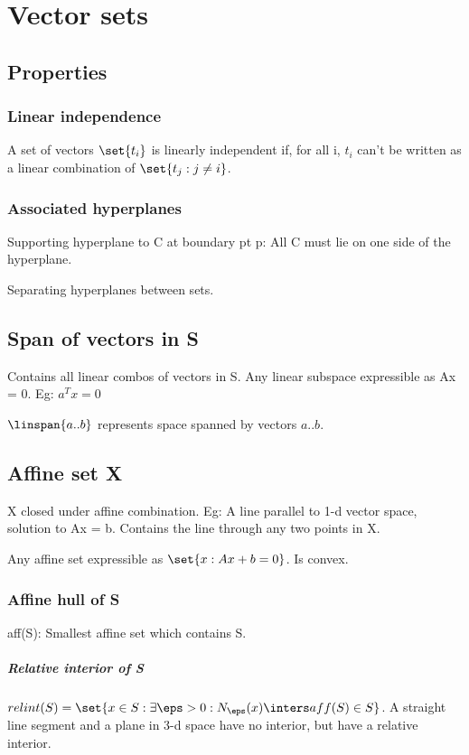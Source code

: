 \documentclass[oneside, article]{memoir}
\begin{document}
\chapter{Vector sets}
\section{Properties}
\subsection{Linear independence}
A set of vectors $\set{t_i}$ is linearly independent if, for all i, $t_i$ can't be written as a linear combination of $\set{t_{j}: j \neq i}$.

\subsection{Associated hyperplanes}
Supporting hyperplane to C at boundary pt p: All C must lie on one side of the hyperplane.

Separating hyperplanes between sets.

\section{Span of vectors in S}
Contains all linear combos of vectors in S. Any linear subspace expressible as Ax = 0. Eg: $a^{T}x = 0$

$\linspan{a..b}$ represents space spanned by vectors $a .. b$.

\section{Affine set X}
X closed under affine combination. Eg: A line parallel to 1-d vector space, solution to Ax = b. Contains the line through any two points in X.

 Any affine set expressible as $\set{x: Ax + b = 0}$. Is convex.

\subsection{Affine hull of S}
aff(S): Smallest affine set which contains S.

\paragraph*{Relative interior of S}
$relint(S) = \set{x \in S: \exists \eps>0: N_\eps(x) \inters aff(S) \in S}$. A straight line segment and a plane in 3-d space have no interior, but have a relative interior.
\end{document}
